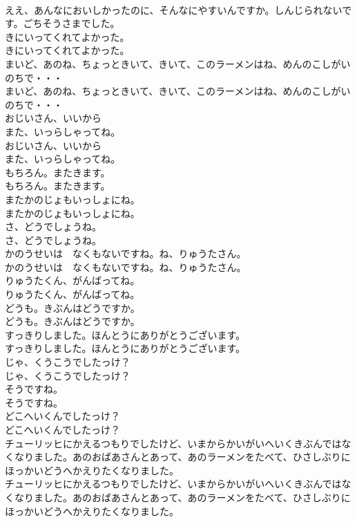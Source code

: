 \documentclass[8pt]{extreport}
\begin{document}
\begin{CJK}{UTF8}{min}
\\	ええ、あんなにおいしかったのに、そんなにやすいんですか。しんじられないです。ごちそうさまでした。
\\	きにいってくれてよかった。
\\	きにいってくれてよかった。
\\	まいど、あのね、ちょっときいて、きいて、このラーメンはね、めんのこしがいのちで・・・
\\	まいど、あのね、ちょっときいて、きいて、このラーメンはね、めんのこしがいのちで・・・
\\	おじいさん、いいから
\\	また、いっらしゃってね。
\\	おじいさん、いいから
\\	また、いっらしゃってね。
\\	もちろん。またきます。
\\	もちろん。またきます。
\\	またかのじょもいっしょにね。
\\	またかのじょもいっしょにね。
\\	さ、どうでしょうね。
\\	さ、どうでしょうね。
\\	かのうせいは　なくもないですね。ね、りゅうたさん。
\\	かのうせいは　なくもないですね。ね、りゅうたさん。
\\	りゅうたくん、がんばってね。
\\	りゅうたくん、がんばってね。
\\	どうも。きぶんはどうですか。
\\	どうも。きぶんはどうですか。
\\	すっきりしました。ほんとうにありがとうございます。
\\	すっきりしました。ほんとうにありがとうございます。
\\	じゃ、くうこうでしたっけ？
\\	じゃ、くうこうでしたっけ？
\\	そうですね。
\\	そうですね。
\\	どこへいくんでしたっけ？
\\	どこへいくんでしたっけ？
\\	チューリッヒにかえるつもりでしたけど、いまからかいがいへいくきぶんではなくなりました。あのおばあさんとあって、あのラーメンをたべて、ひさしぶりにほっかいどうへかえりたくなりました。
\\	チューリッヒにかえるつもりでしたけど、いまからかいがいへいくきぶんではなくなりました。あのおばあさんとあって、あのラーメンをたべて、ひさしぶりにほっかいどうへかえりたくなりました。

\end{CJK}
\end{document}
